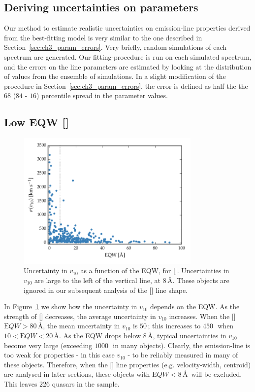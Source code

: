 \subsection{Deriving uncertainties on parameters}

Our method to estimate realistic uncertainties on emission-line properties derived from the best-fitting model is very similar to the one described in Section~\ref{sec:ch3_param_errors}. 
Very briefly, random simulations of each spectrum are generated.
Our fitting-procedure is run on each simulated spectrum, and the errors on the line parameters are estimated by looking at the distribution of values from the ensemble of simulations. 
In a slight modification of the procedure in Section~\ref{sec:ch3_param_errors}, the error is defined as half the the $68$ ($84$ - $16$) percentile spread in the parameter values. 

\subsection{Low EQW []}

\begin{figure}
    \centering
    \includegraphics[width=0.8\textwidth]{figures/chapter04/eqw_cut.pdf} 
    \caption[{Uncertainty in $v_{10}$ as a function of the EQW, for [].}]{Uncertainty in $v_{10}$ as a function of the EQW, for []. Uncertainties in $v_{10}$ are large to the left of the vertical line, at $8$\,\AA. These objects are ignored in our subsequent analysis of the [] line shape.}     
    \label{fig:eqw_cut}
\end{figure}

In Figure~\ref{fig:eqw_cut} we show how the uncertainty in $v_{10}$ depends on the EQW. 
As the strength of [] decreases, the average uncertainty in $v_{10}$ increases.
When the [] ${\mathrm EQW} > 80$\,\AA, the mean uncertainty in $v_{10}$ is $50$\,\kms; this increases to $450$\,\kms\, when $10 < {\mathrm EQW} < 20$\,\AA. 
As the EQW drops below $8$\,\AA, typical uncertainties in $v_{10}$ become very large (exceeding $1000$\,\kms\, in many objects). 
Clearly, the emission-line is too weak for properties - in this case $v_{10}$ - to be reliably measured in many of these objects. 
Therefore, when the [] line properties (e.g. velocity-width, centroid) are analysed in later sections, these objects with ${\mathrm EQW} < 8$\,\AA\, will be excluded. 
This leaves $226$ quasars in the sample. 

